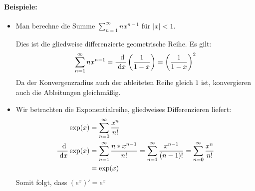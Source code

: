 \clearpage
\paragraph{Beispiele:}
\begin{itemize}
	\item Man berechne die Summe $\sum_{n=1}^\infty nx^{n-1}$ für $|x|<1$.

	Dies ist die gliedweise differenzierte geometrische Reihe. Es gilt:
	\begin{equation*}
		\sum\limits_{n=1}^\infty nx^{n-1}=\frac{\ \operatorname{d}\!}{\ \operatorname{d}\! x}\left(\frac{1}{1-x}\right)=\left(\frac{1}{1-x}\right)^2
	\end{equation*}
	Da der Konvergenzradius auch der ableiteten Reihe gleich $1$ ist, konvergieren auch die Ableitungen gleichmäßig.

	\item Wir betrachten die Exponentialreihe, gliedweises Differenzieren liefert:
	\begin{align*}
		\exp(x)&=\sum\limits_{n=0}^\infty \frac{x^n}{n!}\\
		\frac{\ \operatorname{d}\!}{\ \operatorname{d}\! x}\exp(x)&=\sum\limits_{n=1}^\infty \frac{n*x^{n-1}}{n!}=\sum\limits_{n=1}^\infty \frac{x^{n-1}}{(n-1)!}=\sum\limits_{n=0}^\infty \frac{x^{n}}{n!}\\
		&=\exp(x)
	\end{align*}
	Somit folgt, dass $(e^x)'=e^x$
\end{itemize}
